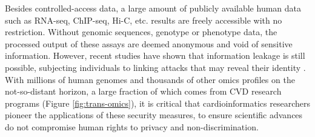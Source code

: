 \documentclass[letter]{bioinfo}
\begin{document}
    Besides controlled-access data, a large amount of publicly available human data such as RNA-seq, ChIP-seq, Hi-C, etc. results are freely accessible with no restriction. Without genomic sequences, genotype or phenotype data, the processed output of these assays are deemed anonymous and void of sensitive information. However, recent studies have shown that information leakage is still possible, subjecting individuals to linking attacks that may reveal their identity \citep{Harmanci:2016:Quantification, Harmanci:2018:Analysis}.  With millions of human genomes and thousands of other omics profiles on the not-so-distant horizon, a large fraction of which comes from CVD research programs (Figure \ref{fig:trans-omics}), it is critical that cardioinformatics researchers pioneer the applications of these security measures, to ensure scientific advances do not compromise human rights to privacy and non-discrimination.
	
\end{document}
